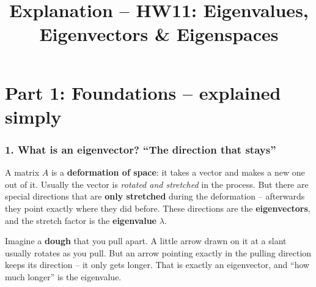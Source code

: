 \documentclass[a4paper,12pt]{article}
\title{Explanation -- HW11: Eigenvalues, Eigenvectors \& Eigenspaces}
\author{}
\date{}
\begin{document}
\maketitle

\part*{Part 1: Foundations -- explained simply}

\section*{1. What is an eigenvector? ``The direction that stays''}

A matrix $A$ is a \textbf{deformation of space}: it takes a vector and makes a new one out of it. Usually the vector is \emph{rotated and stretched} in the process. But there are special directions that are \textbf{only stretched} during the deformation -- afterwards they point exactly where they did before. These directions are the \textbf{eigenvectors}, and the stretch factor is the \textbf{eigenvalue} $\lambda$.

\begin{center}
\end{center}

\begin{analogie}
Imagine a \textbf{dough} that you pull apart. A little arrow drawn on it at a slant usually rotates as you pull. But an arrow pointing exactly in the pulling direction keeps its direction -- it only gets longer. That is exactly an eigenvector, and ``how much longer'' is the eigenvalue.
\end{analogie}
\end{document}
